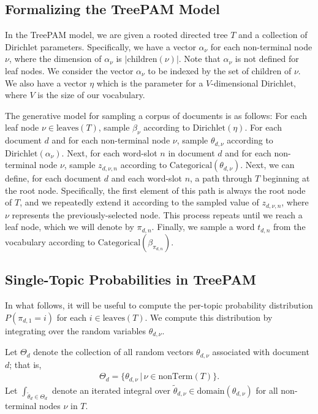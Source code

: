 \documentclass{article}
\theoremstyle{definition}
\newcommand{\Dirichlet}{\text{Dirichlet}}
\newcommand{\Categorical}{\text{Categorical}}
\newcommand{\leaves}{\text{leaves}}
\newcommand{\nonTerm}{\text{nonTerm}}
\newcommand{\domain}{\text{domain}}
\begin{document}
\subsection{Formalizing the TreePAM Model}

In the TreePAM model, we are given a rooted directed tree $T$ and a collection of Dirichlet parameters.
Specifically, we have a vector $\alpha_\nu$ for each non-terminal node $\nu$, where the dimension of $\alpha_\nu$ is $|\text{children}(\nu)|$.
Note that $\alpha_\nu$ is not defined for leaf nodes.
We consider the vector $\alpha_\nu$ to be indexed by the set of children of $\nu$.
We also have a vector $\eta$ which is the parameter for a $V$-dimensional Dirichlet, where $V$ is the size of our vocabulary.

The generative model for sampling a corpus of documents is as follows:
For each leaf node $\nu \in \leaves(T)$, sample $\beta_\nu$ according to $\Dirichlet(\eta)$.
For each document $d$ and for each non-terminal node $\nu$, sample $\theta_{d,\nu}$ according to $\Dirichlet(\alpha_\nu)$.
Next, for each word-slot $n$ in document $d$ and for each non-terminal node $\nu$, sample $z_{d,\nu,n}$ according to $\Categorical(\theta_{d,\nu})$.
Next, we can define, for each document $d$ and each word-slot $n$, a path through $T$ beginning at the root node.
Specifically, the first element of this path is always the root node of $T$, and we repeatedly extend it according to the sampled value of $z_{d,\nu,n}$, where $\nu$ represents the previously-selected node.
This process repeats until we reach a leaf node, which we will denote by $\pi_{d,n}$.
Finally, we sample a word $t_{d,n}$ from the vocabulary according to $\Categorical(\beta_{\pi_{d,n}})$.

\subsection{Single-Topic Probabilities in TreePAM}

In what follows, it will be useful to compute the per-topic probability distribution $P(\pi_{d,1} = i)$ for each $i \in \leaves(T)$.
We compute this distribution by integrating over the random variables $\theta_{d,\nu}$.

Let $\Theta_d$ denote the collection of all random vectors $\theta_{d,\nu}$ associated with document $d$; that is,
\begin{align*}
\Theta_d = \{\theta_{d,\nu} \, | \, \nu \in \nonTerm(T) \}.
\end{align*}
Let $\int_{\tilde \theta_d \in \Theta_d}$ denote an iterated integral over $\tilde \theta_{d,\nu} \in \domain(\theta_{d,\nu})$ for all non-terminal nodes $\nu$ in $T$.
\end{document}
